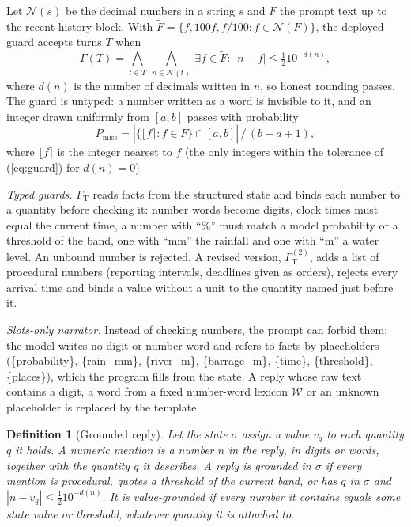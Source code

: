 \documentclass[conference]{IEEEtran}
\newtheorem{definition}{Definition}
\begin{document}
Let $\mathcal{N}(s)$ be the decimal numbers in a string $s$ and $F$ the prompt text up to the recent-history block. With $\tilde F=\{f,100f,f/100: f\in\mathcal{N}(F)\}$, the deployed guard accepts turns $T$ when
\begin{equation}
\Gamma(T)=\bigwedge_{t\in T}\ \bigwedge_{n\in\mathcal{N}(t)}\ \exists f\in\tilde F:\ |n-f|\le \tfrac12 10^{-d(n)},
\label{eq:guard}
\end{equation}
where $d(n)$ is the number of decimals written in $n$, so honest rounding passes. The guard is untyped: a number written as a word is invisible to it, and an integer drawn uniformly from $[a,b]$ passes with probability
\begin{equation}
P_{\mathrm{miss}}= |\{\lfloor f\rceil : f\in\tilde F\}\cap[a,b]|\,/\,(b-a+1),
\label{eq:miss}
\end{equation}
where $\lfloor f\rceil$ is the integer nearest to $f$ (the only integers within the tolerance of (\ref{eq:guard}) for $d(n)=0$).

\textit{Typed guards.} $\Gamma_{\mathrm{T}}$ reads facts from the structured state and binds each number to a quantity before checking it: number words become digits, clock times must equal the current time, a number with ``\%'' must match a model probability or a threshold of the band, one with ``mm'' the rainfall and one with ``m'' a water level. An unbound number is rejected. A revised version, $\Gamma_{\mathrm{T}}^{(2)}$, adds a list of procedural numbers (reporting intervals, deadlines given as orders), rejects every arrival time and binds a value without a unit to the quantity named just before it.

\textit{Slots-only narrator.} Instead of checking numbers, the prompt can forbid them: the model writes no digit or number word and refers to facts by placeholders (\{probability\}, \{rain\_mm\}, \{river\_m\}, \{barrage\_m\}, \{time\}, \{threshold\}, \{places\}), which the program fills from the state. A reply whose raw text contains a digit, a word from a fixed number-word lexicon $\mathcal{W}$ or an unknown placeholder is replaced by the template.

\begin{definition}[Grounded reply]
Let the state $\sigma$ assign a value $v_q$ to each quantity $q$ it holds. A \emph{numeric mention} is a number $n$ in the reply, in digits or words, together with the quantity $q$ it describes. A reply is \emph{grounded} in $\sigma$ if every mention is procedural, quotes a threshold of the current band, or has $q$ in $\sigma$ and $|n-v_q|\le\frac12 10^{-d(n)}$. It is \emph{value-grounded} if every number it contains equals some state value or threshold, whatever quantity it is attached to.
\end{definition}
\end{document}
